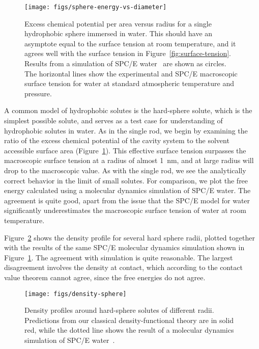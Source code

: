 \documentclass[twocolumn,amsmath,amssymb,prl]{revtex4-1}
\begin{document}
\begin{figure}
\begin{center}
\texttt{[image: figs/sphere-energy-vs-diameter]}
\end{center}
\caption{ Excess chemical potential per area versus radius for
  a single hydrophobic sphere
  immersed in water. This should have an asymptote equal to the
  surface tension at room temperature, and it agrees well with the
  surface tension in Figure~\ref{fig:surface-tension}. Results from a
  simulation of SPC/E water~\cite{huang2001shs} are shown as circles.
  The horizontal lines show the experimental and SPC/E macroscopic surface
  tension for water at standard atmospheric temperature and
  pressure. }
\label{fig:sphere-energy-vs-diameter}
\end{figure}

A common model of hydrophobic solutes is the hard-sphere solute, which
is the simplest possible solute, and serves as a test case for
understanding of hydrophobic solutes in
water\cite{sedlmeier2011entropy}.  As in the single rod, we begin by
examining the ratio of the excess chemical potential of the cavity
system to the solvent accessible surface area
(Figure~\ref{fig:sphere-energy-vs-diameter}).  This
effective surface tension surpasses the macroscopic surface tension at a
radius of almost 1~nm, and at large radius will drop to the macroscopic value.  As
with the single rod, we see the analytically correct behavior in the
limit of small solutes.  For comparison, we plot the free energy
calculated using a molecular dynamics simulation of SPC/E
water\cite{huang2001shs}.  The agreement is quite good, apart from the
issue that the SPC/E model for water significantly underestimates the
macroscopic surface tension of water at room
temperature\cite{vega2007surface}.

Figure~\ref{fig:density-sphere} shows the density profile for several
hard sphere radii, plotted together with the results of the same
SPC/E molecular dynamics simulation shown in
Figure~\ref{fig:sphere-energy-vs-diameter}\cite{huang2001shs}.  The
agreement with simulation is quite reasonable.  The largest
disagreement involves the density at contact, which according to the
contact value theorem cannot agree, since the free energies do not
agree.

\begin{figure}
\begin{center}
\texttt{[image: figs/density-sphere]}
\end{center}
\caption{ Density profiles around hard-sphere solutes of different radii. Predictions
  from our classical density-functional theory are in solid red, while
  the dotted line shows the result of a molecular dynamics simulation
  of SPC/E water~\cite{huang2001shs}.  }
\label{fig:density-sphere}
\end{figure}
\end{document}
